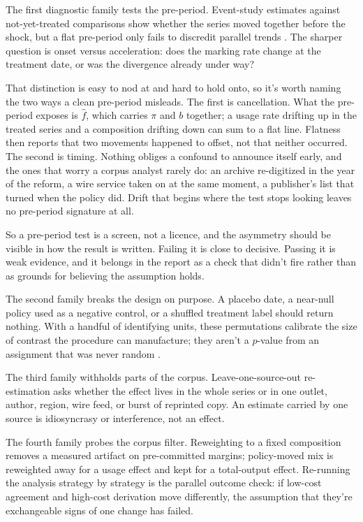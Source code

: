 The first diagnostic family tests the pre-period. Event-study estimates against not-yet-treated comparisons \citep{SunAbraham2021,BorusyakJaravelSpiess2024} show whether the series moved together before the shock, but a flat pre-period only fails to discredit parallel trends \citep{RothSantAnnaBilinskiPoe2023}. The sharper question is onset versus acceleration: does the marking rate change at the treatment date, or was the divergence already under way?

That distinction is easy to nod at and hard to hold onto, so it's worth naming the two ways a clean pre-period misleads. The first is cancellation. What the pre-period exposes is $\hat f$, which carries $\pi$ and $b$ together; a usage rate drifting up in the treated series and a composition drifting down can sum to a flat line. Flatness then reports that two movements happened to offset, not that neither occurred. The second is timing. Nothing obliges a confound to announce itself early, and the ones that worry a corpus analyst rarely do: an archive re-digitized in the year of the reform, a wire service taken on at the same moment, a publisher's list that turned when the policy did. Drift that begins where the test stops looking leaves no pre-period signature at all.

So a pre-period test is a screen, not a licence, and the asymmetry should be visible in how the result is written. Failing it is close to decisive. Passing it is weak evidence, and it belongs in the report as a check that didn't fire rather than as grounds for believing the assumption holds.

The second family breaks the design on purpose. A placebo date, a near-null policy used as a negative control, or a shuffled treatment label should return nothing. With a handful of identifying units, these permutations calibrate the size of contrast the procedure can manufacture; they aren't a $p$-value from an assignment that was never random \citep{BertrandDufloMullainathan2004}.

The third family withholds parts of the corpus. Leave-one-source-out re-estimation asks whether the effect lives in the whole series or in one outlet, author, region, wire feed, or burst of reprinted copy. An estimate carried by one source is idiosyncrasy or interference, not an effect.

The fourth family probes the corpus filter. Reweighting to a fixed composition removes a measured artifact on pre-committed margins; policy-moved mix is reweighted away for a usage effect and kept for a total-output effect. Re-running the analysis strategy by strategy is the parallel outcome check: if low-cost agreement and high-cost derivation move differently, the assumption that they're exchangeable signs of one change has failed.

